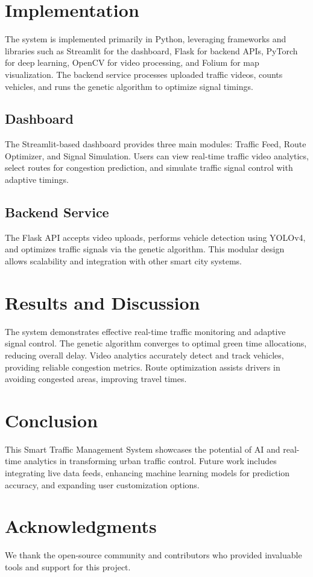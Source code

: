 \documentclass[conference]{IEEEtran}
\begin{document}
\section{Implementation}
The system is implemented primarily in Python, leveraging frameworks and libraries such as Streamlit for the dashboard, Flask for backend APIs, PyTorch for deep learning, OpenCV for video processing, and Folium for map visualization. The backend service processes uploaded traffic videos, counts vehicles, and runs the genetic algorithm to optimize signal timings.

\subsection{Dashboard}
The Streamlit-based dashboard provides three main modules: Traffic Feed, Route Optimizer, and Signal Simulation. Users can view real-time traffic video analytics, select routes for congestion prediction, and simulate traffic signal control with adaptive timings.

\subsection{Backend Service}
The Flask API accepts video uploads, performs vehicle detection using YOLOv4, and optimizes traffic signals via the genetic algorithm. This modular design allows scalability and integration with other smart city systems.

\section{Results and Discussion}
The system demonstrates effective real-time traffic monitoring and adaptive signal control. The genetic algorithm converges to optimal green time allocations, reducing overall delay. Video analytics accurately detect and track vehicles, providing reliable congestion metrics. Route optimization assists drivers in avoiding congested areas, improving travel times.

\section{Conclusion}
This Smart Traffic Management System showcases the potential of AI and real-time analytics in transforming urban traffic control. Future work includes integrating live data feeds, enhancing machine learning models for prediction accuracy, and expanding user customization options.

\section*{Acknowledgments}
We thank the open-source community and contributors who provided invaluable tools and support for this project.



\end{document}
